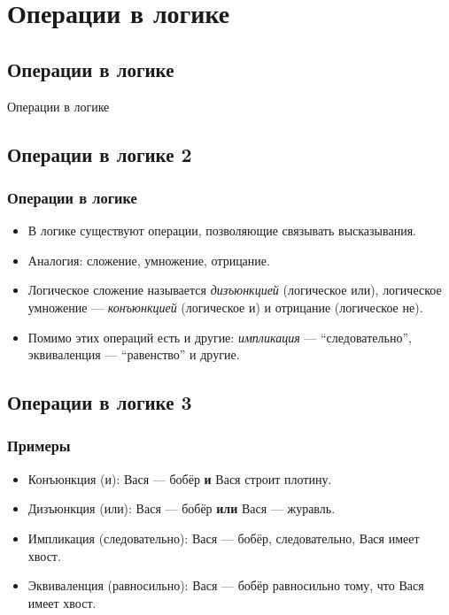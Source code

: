 \documentclass[compress,red]{beamer}
\begin{document}
\section{Операции в логике}
\subsection{Операции в логике}
\begin{frame}
  \begin{center}
    \Huge{Операции в логике}
  \end{center}
\end{frame}

\subsection{Операции в логике 2}
\begin{frame}[fragile]
  \frametitle{Операции в логике}
  \begin{itemize}
    \item В логике существуют операции, позволяющие связывать высказывания.
    \item Аналогия: сложение, умножение, отрицание.
    \item Логическое сложение называется \emph{дизъюнкцией} (логическое или), логическое умножение --- \emph{конъюнкцией} (логическое и) и отрицание (логическое не).
    \item Помимо этих операций есть и другие: \emph{импликация} --- ``следовательно'', эквиваленция --- ``равенство'' и другие.
  \end{itemize}
\end{frame}

\subsection{Операции в логике 3}
\begin{frame}[fragile]
  \frametitle{Примеры}
  \begin{itemize}
    \item Конъюнкция (и): Вася --- бобёр \textbf{и} Вася строит плотину.
    \item Дизъюнкция (или): Вася --- бобёр \textbf{или} Вася --- журавль. 
    \item Импликация (следовательно): Вася --- бобёр, следовательно, Вася имеет хвост.
    \item Эквиваленция (равносильно): Вася --- бобёр равносильно тому, что Вася имеет хвост.
  \end{itemize}
\end{frame}
\end{document}
